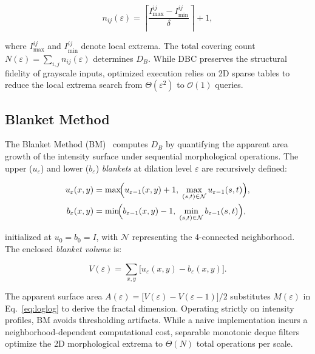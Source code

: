 \begin{equation}
  n_{ij}(\varepsilon)
    = \left\lceil \frac{I_{\max}^{ij} - I_{\min}^{ij}}{\delta}
      \right\rceil + 1,
  \label{eq:dbc_count}
\end{equation}

\noindent where $I_{\max}^{ij}$ and $I_{\min}^{ij}$ denote local extrema. The total covering count $N(\varepsilon) = \sum_{i,j} n_{ij}(\varepsilon)$ determines $D_B$. While DBC preserves the structural fidelity of grayscale inputs, optimized execution relies on 2D sparse tables to reduce the local extrema search from $\Theta(\varepsilon^2)$ to $\mathcal{O}(1)$ queries.

\subsection{Blanket Method}
\label{sec:theory:bm}

The Blanket Method (BM)~\cite{Peleg1984} computes $D_B$ by quantifying the apparent area growth of the intensity surface under sequential morphological operations. The upper ($u_\varepsilon$) and lower ($b_\varepsilon$) \textit{blankets} at dilation level $\varepsilon$ are recursively defined:

\begin{align}
  u_\varepsilon(x,y) &= \max\!\Bigl(u_{\varepsilon-1}(x,y)+1,\;
    \max_{(s,t)\in\mathcal{N}} u_{\varepsilon-1}(s,t)\Bigr),
  \label{eq:blanket_u} \\
  b_\varepsilon(x,y) &= \min\!\Bigl(b_{\varepsilon-1}(x,y)-1,\;
    \min_{(s,t)\in\mathcal{N}} b_{\varepsilon-1}(s,t)\Bigr),
  \label{eq:blanket_b}
\end{align}

\noindent initialized at $u_0 = b_0 = I$, with $\mathcal{N}$ representing the 4-connected neighborhood. The enclosed \textit{blanket volume} is:

\begin{equation}
  V(\varepsilon)
    = \sum_{x,y} \bigl[u_\varepsilon(x,y) - b_\varepsilon(x,y)\bigr].
  \label{eq:blanket_vol}
\end{equation}

\noindent The apparent surface area $A(\varepsilon) = \bigl[V(\varepsilon) - V(\varepsilon{-}1)\bigr] / 2$ substitutes $M(\varepsilon)$ in Eq.~\eqref{eq:loglog} to derive the fractal dimension. Operating strictly on intensity profiles, BM avoids thresholding artifacts. While a naive implementation incurs a neighborhood-dependent computational cost, separable monotonic deque filters~\cite{Lemire2006} optimize the 2D morphological extrema to $\Theta(N)$ total operations per scale.